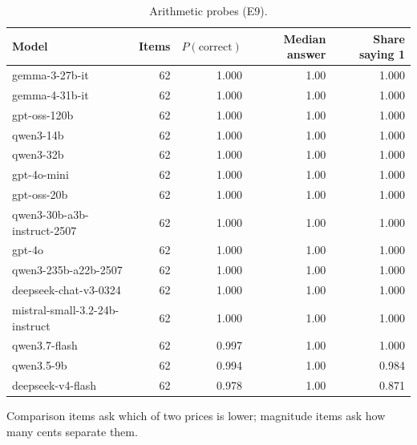 \begin{table}[t]
\centering
\caption{Arithmetic probes (E9).}
\label{tab:e9}
\small
\begin{tabular}{lrrrr}
\toprule
Model & Items & $P(\text{correct})$ & Median answer & Share saying 1 \\
\midrule
gemma-3-27b-it & 62 & 1.000 & 1.00 & 1.000 \\
gemma-4-31b-it & 62 & 1.000 & 1.00 & 1.000 \\
gpt-oss-120b & 62 & 1.000 & 1.00 & 1.000 \\
qwen3-14b & 62 & 1.000 & 1.00 & 1.000 \\
qwen3-32b & 62 & 1.000 & 1.00 & 1.000 \\
gpt-4o-mini & 62 & 1.000 & 1.00 & 1.000 \\
gpt-oss-20b & 62 & 1.000 & 1.00 & 1.000 \\
qwen3-30b-a3b-instruct-2507 & 62 & 1.000 & 1.00 & 1.000 \\
gpt-4o & 62 & 1.000 & 1.00 & 1.000 \\
qwen3-235b-a22b-2507 & 62 & 1.000 & 1.00 & 1.000 \\
deepseek-chat-v3-0324 & 62 & 1.000 & 1.00 & 1.000 \\
mistral-small-3.2-24b-instruct & 62 & 1.000 & 1.00 & 1.000 \\
qwen3.7-flash & 62 & 0.997 & 1.00 & 1.000 \\
qwen3.5-9b & 62 & 0.994 & 1.00 & 0.984 \\
deepseek-v4-flash & 62 & 0.978 & 1.00 & 0.871 \\
\bottomrule
\end{tabular}
\vspace{2pt}
\parbox{\linewidth}{\footnotesize Comparison items ask which of two prices is lower; magnitude items ask how many cents separate them.}
\end{table}
